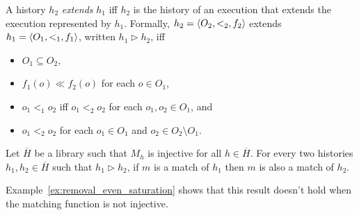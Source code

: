 
A history $h_2$ \emph{extends} $h_1$ iff $h_2$ is the history
of an execution that extends the execution represented by $h_1$. Formally, $h_2
= {\langle{O_2,<_2,f_2}\rangle}$ extends $h_1 = {\langle{O_1,<_1,f_1}\rangle}$, written $h_1
\vartriangleright h_2$, iff
\begin{itemize}

	\item $O_1\subseteq O_2$, 
	
	\item $f_1(o) \ll f_2(o)$ for each $o \in O_1$,
	
	\item $o_1 <_1 o_2$ iff $o_1 <_2 o_2$ for each $o_1,o_2\in O_1$, and
	
	\item $o_1 <_2 o_2$ for each $o_1\in O_1$ and $o_2\in O_2\setminus O_1$.

\end{itemize}

\begin{lemma}
  \label{lem:match_extension1}

  Let $\overline{H}$ be a library such that $M_h$ is injective for all $h\in
  \overline{H}$. For every two histories $h_1, h_2\in \overline{H}$ such that
  $h_1 \vartriangleright h_2$, if $m$ is a match of $h_1$ then $m$ is also a
  match of $h_2$.

\end{lemma}

Example~\ref{ex:removal_even_saturation} shows that this result doesn't hold
when the matching function is not injective.

